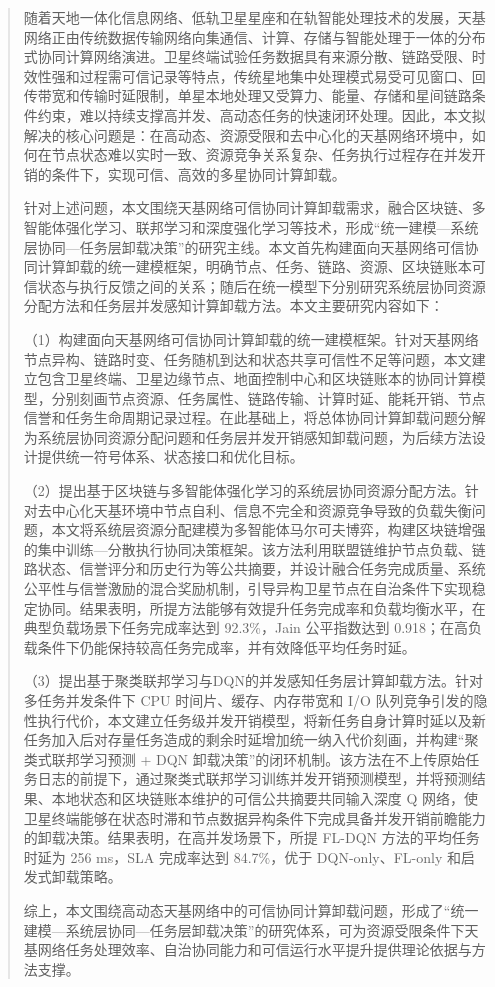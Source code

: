 \begin{abstract}
  随着天地一体化信息网络、低轨卫星星座和在轨智能处理技术的发展，天基网络正由传统数据传输网络向集通信、计算、存储与智能处理于一体的分布式协同计算网络演进。卫星终端试验任务数据具有来源分散、链路受限、时效性强和过程需可信记录等特点，传统星地集中处理模式易受可见窗口、回传带宽和传输时延限制，单星本地处理又受算力、能量、存储和星间链路条件约束，难以持续支撑高并发、高动态任务的快速闭环处理。因此，本文拟解决的核心问题是：在高动态、资源受限和去中心化的天基网络环境中，如何在节点状态难以实时一致、资源竞争关系复杂、任务执行过程存在并发开销的条件下，实现可信、高效的多星协同计算卸载。

  针对上述问题，本文围绕天基网络可信协同计算卸载需求，融合区块链、多智能体强化学习、联邦学习和深度强化学习等技术，形成“统一建模—系统层协同—任务层卸载决策”的研究主线。本文首先构建面向天基网络可信协同计算卸载的统一建模框架，明确节点、任务、链路、资源、区块链账本可信状态与执行反馈之间的关系；随后在统一模型下分别研究系统层协同资源分配方法和任务层并发感知计算卸载方法。本文主要研究内容如下：

  （1）构建面向天基网络可信协同计算卸载的统一建模框架。针对天基网络节点异构、链路时变、任务随机到达和状态共享可信性不足等问题，本文建立包含卫星终端、卫星边缘节点、地面控制中心和区块链账本的协同计算模型，分别刻画节点资源、任务属性、链路传输、计算时延、能耗开销、节点信誉和任务生命周期记录过程。在此基础上，将总体协同计算卸载问题分解为系统层协同资源分配问题和任务层并发开销感知卸载问题，为后续方法设计提供统一符号体系、状态接口和优化目标。

  （2）提出基于区块链与多智能体强化学习的系统层协同资源分配方法。针对去中心化天基环境中节点自利、信息不完全和资源竞争导致的负载失衡问题，本文将系统层资源分配建模为多智能体马尔可夫博弈，构建区块链增强的集中训练—分散执行协同决策框架。该方法利用联盟链维护节点负载、链路状态、信誉评分和历史行为等公共摘要，并设计融合任务完成质量、系统公平性与信誉激励的混合奖励机制，引导异构卫星节点在自治条件下实现稳定协同。结果表明，所提方法能够有效提升任务完成率和负载均衡水平，在典型负载场景下任务完成率达到 92.3\%，Jain 公平指数达到 0.918；在高负载条件下仍能保持较高任务完成率，并有效降低平均任务时延。

  （3）提出基于聚类联邦学习与DQN的并发感知任务层计算卸载方法。针对多任务并发条件下 CPU 时间片、缓存、内存带宽和 I/O 队列竞争引发的隐性执行代价，本文建立任务级并发开销模型，将新任务自身计算时延以及新任务加入后对存量任务造成的剩余时延增加统一纳入代价刻画，并构建“聚类式联邦学习预测 + DQN 卸载决策”的闭环机制。该方法在不上传原始任务日志的前提下，通过聚类式联邦学习训练并发开销预测模型，并将预测结果、本地状态和区块链账本维护的可信公共摘要共同输入深度 Q 网络，使卫星终端能够在状态时滞和节点数据异构条件下完成具备并发开销前瞻能力的卸载决策。结果表明，在高并发场景下，所提 FL-DQN 方法的平均任务时延为 256 ms，SLA 完成率达到 84.7\%，优于 DQN-only、FL-only 和启发式卸载策略。

  综上，本文围绕高动态天基网络中的可信协同计算卸载问题，形成了“统一建模—系统层协同—任务层卸载决策”的研究体系，可为资源受限条件下天基网络任务处理效率、自治协同能力和可信运行水平提升提供理论依据与方法支撑。
\end{abstract}



